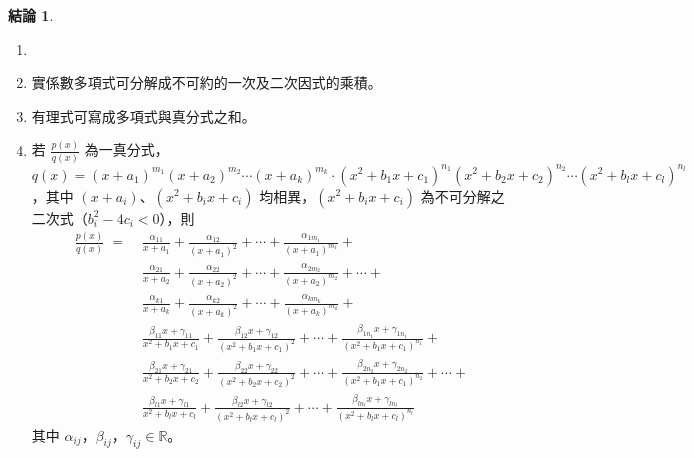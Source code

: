 \documentclass[12pt]{extarticle}
\newcommand{\ds}{\displaystyle}
\theoremstyle{definition}
\newtheorem*{fact}{結論}
\begin{document}
\begin{fact}
  \begin{enumerate}\setlength{\itemsep}{0pt}
    \item[]
    \item 實係數多項式可分解成不可約的一次及二次因式的乘積。
    \item 有理式可寫成多項式與真分式之和。
    \item 若 $\ds\frac{p(x)}{q(x)}$ 為一真分式，$\ds q(x) = (x + a_1)^{m_1}(x + a_2)^{m_2}\cdots(x + a_k)^{m_k}\cdot(x^2 + b_1 x + c_1)^{n_1}(x^2 + b_2 x + c_2)^{n_2}\cdots(x^2 + b_l x + c_l)^{n_l}$，其中 $(x + a_i)$、$(x^2 + b_i x + c_i)$ 均相異，$(x^2 + b_i x + c_i)$ 為不可分解之二次式（$b_i^2 - 4 c_i < 0$），則
      \begin{align*}
        \frac{p(x)}{q(x)} \;=\; &\frac{\alpha_{11}}{x + a_1} + \frac{\alpha_{12}}{(x + a_1)^2} + \cdots + \frac{\alpha_{1m_1}}{(x + a_1)^{m_1}} + \\
        & \frac{\alpha_{21}}{x + a_2} + \frac{\alpha_{22}}{(x + a_2)^2} + \cdots + \frac{\alpha_{2{m_2}}}{(x + a_2)^{m_2}} + \cdots + \\
        & \frac{\alpha_{k1}}{x + a_k} + \frac{\alpha_{k2}}{(x + a_k)^2} + \cdots + \frac{\alpha_{k{m_k}}}{(x + a_k)^{m_k}} + \\
        & \frac{\beta_{11} x + \gamma_{11}}{x^2 + b_1 x + c_1} + \frac{\beta_{12} x + \gamma_{12}}{(x^2 + b_1 x + c_1)^2} + \cdots + \frac{\beta_{1n_1} x + \gamma_{1n_1}}{(x^2 + b_1 x + c_1)^{n_1}} + \\
        & \frac{\beta_{21} x + \gamma_{21}}{x^2 + b_2 x + c_2} + \frac{\beta_{22} x + \gamma_{22}}{(x^2 + b_2 x + c_2)^2} + \cdots + \frac{\beta_{2n_2} x + \gamma_{2n_2}}{(x^2 + b_1 x + c_1)^{n_2}} + \cdots + \\
        & \frac{\beta_{l1} x + \gamma_{l1}}{x^2 + b_l x + c_l} + \frac{\beta_{l2} x + \gamma_{l2}}{(x^2 + b_l x + c_l)^2} + \cdots + \frac{\beta_{ln_l} x + \gamma_{ln_l}}{(x^2 + b_l x + c_l)^{n_l}}
      \end{align*}
      其中 $\ds\alpha_{ij}$，$\ds\beta_{ij}$，$\ds\gamma_{ij}\in\mathbb{R}$。


\end{enumerate}
\end{fact}
\end{document}
